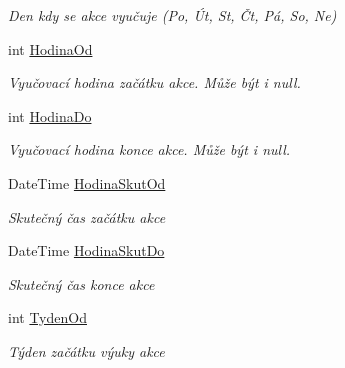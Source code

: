 \begin{DoxyCompactItemize}
\begin{DoxyCompactList}\small\item\em Den kdy se akce vyučuje (Po, Út, St, Čt, Pá, So, Ne) \end{DoxyCompactList}\item 
int \hyperlink{class_analyza_rozvrhu_1_1_s_t_a_g___classes_1_1_rozvrhova_akce_adc80da33299bcf88de4d642fc9e97bb8}{Hodina\+Od}
\begin{DoxyCompactList}\small\item\em Vyučovací hodina začátku akce. Může být i null. \end{DoxyCompactList}\item 
int \hyperlink{class_analyza_rozvrhu_1_1_s_t_a_g___classes_1_1_rozvrhova_akce_aa48aa2c83a7c0bf23d2aa3d37851c009}{Hodina\+Do}
\begin{DoxyCompactList}\small\item\em Vyučovací hodina konce akce. Může být i null. \end{DoxyCompactList}\item 
Date\+Time \hyperlink{class_analyza_rozvrhu_1_1_s_t_a_g___classes_1_1_rozvrhova_akce_a5a52e9f2e80f62fdb559eb19619044d9}{Hodina\+Skut\+Od}
\begin{DoxyCompactList}\small\item\em Skutečný čas začátku akce \end{DoxyCompactList}\item 
Date\+Time \hyperlink{class_analyza_rozvrhu_1_1_s_t_a_g___classes_1_1_rozvrhova_akce_a0045aa78d3b916b26710d9286788806e}{Hodina\+Skut\+Do}
\begin{DoxyCompactList}\small\item\em Skutečný čas konce akce \end{DoxyCompactList}\item 
int \hyperlink{class_analyza_rozvrhu_1_1_s_t_a_g___classes_1_1_rozvrhova_akce_a558f77817a6c7161f0e31d13faebadf7}{Tyden\+Od}
\begin{DoxyCompactList}\small\item\em Týden začátku výuky akce \end{DoxyCompactList}\item 

\end{DoxyCompactItemize}
